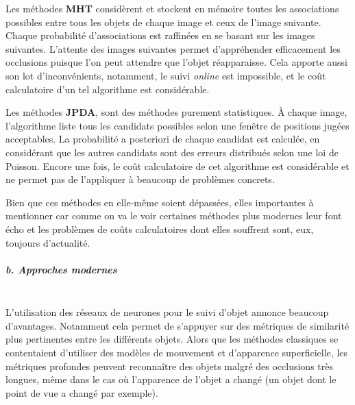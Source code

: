 \documentclass[10pt,twocolumn,letterpaper,french]{article}
\begin{document}
Les méthodes \textbf{MHT} \cite{chenouardMHT, MHTrevisited} considèrent et stockent en mémoire toutes les associations possibles entre tous les objets de chaque image et ceux de l'image suivante. Chaque probabilité d'associations est raffinées en se basant sur les images suivantes. L'attente des images suivantes permet d'appréhender efficacement les occlusions puisque l'on peut attendre que l'objet réapparaisse. Cela apporte aussi son lot d'inconvénients, notamment, le suivi \textit{online} est impossible, et le coût calculatoire d'un tel algorithme est considérable.

Les méthodes \textbf{JPDA}, \cite{FortmannJPDA, JPDArevisited} sont des méthodes purement statistiques. À chaque image, l'algorithme liste tous les candidats possibles selon une fenêtre de positions jugées acceptables. La probabilité a posteriori de chaque candidat est calculée, en considérant que les autres candidats sont des erreurs distribués selon une loi de Poisson. Encore une fois, le coût calculatoire de cet algorithme est considérable et ne permet pas de l'appliquer à beaucoup de problèmes concrets.

Bien que ces méthodes en elle-même soient dépassées, elles importantes à mentionner car comme on va le voir certaines méthodes plus modernes leur font écho et les problèmes de coûts calculatoires dont elles souffrent sont, eux, toujours d'actualité.

\subparagraph{b. Approches modernes\\\\} 

L'utilisation des réseaux de neurones pour le suivi d'objet annonce beaucoup d'avantages. Notamment cela permet de s'appuyer sur des métriques de similarité plus pertinentes entre les différents objets. Alors que les méthodes classiques se contentaient d'utiliser des modèles de mouvement et d'apparence superficielle, les métriques profondes peuvent reconnaître des objets malgré des occlusions très longues, même dans le cas où l'apparence de l'objet a changé (un objet dont le point de vue a changé par exemple).
\end{document}
